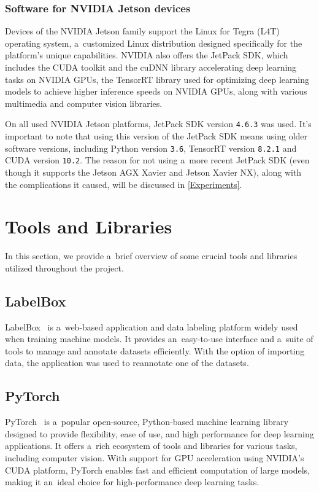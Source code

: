 \subsubsection{Software for NVIDIA Jetson devices}

Devices of the NVIDIA Jetson family support the Linux for Tegra (L4T) operating
system, a~customized Linux distribution designed specifically for the platform's
unique capabilities. NVIDIA also offers the JetPack SDK, which includes the
CUDA toolkit and the cuDNN library accelerating deep learning tasks on NVIDIA
GPUs, the TensorRT library used for optimizing deep learning models to achieve
higher inference speeds on NVIDIA GPUs, along with various multimedia and
computer vision libraries.

On all used NVIDIA Jetson platforms, JetPack SDK version \texttt{4.6.3} was
used. It's important to note that using this version of the JetPack SDK means
using older software versions, including Python version \texttt{3.6}, TensorRT
version \texttt{8.2.1} and CUDA version \texttt{10.2}. The reason for not using
a~more recent JetPack SDK (even though it supports the Jetson AGX Xavier and
Jetson Xavier NX), along with the complications it caused, will be discussed in
\autoref{Experiments}.


\section{Tools and Libraries}

In this section, we provide a~brief overview of some crucial tools and
libraries utilized throughout the project.


\subsection{LabelBox}

LabelBox~\cite{LabelBox} is a~web-based application and data labeling platform
widely used when training machine models. It provides an~easy-to-use interface
and a~suite of tools to manage and annotate datasets efficiently. With the
option of importing data, the application was used to reannotate one of the
datasets.


\subsection{PyTorch}

PyTorch~\cite{PyTorch} is a~popular open-source, Python-based machine learning
library designed to provide flexibility, ease of use, and high performance for
deep learning applications. It offers a~rich ecosystem of tools and libraries for
various tasks, including computer vision. With support for GPU acceleration
using NVIDIA's CUDA platform, PyTorch enables fast and efficient computation of
large models, making it an~ideal choice for high-performance deep learning
tasks.

